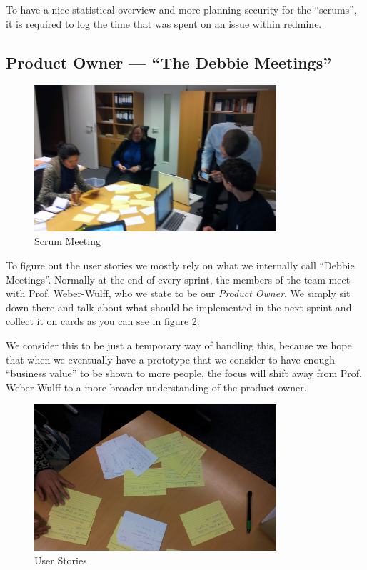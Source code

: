 To have a nice statistical overview and more planning security for the \enquote{scrums}, it is required to log the time 
that was spent on an issue within redmine.


\subsection{Product Owner --- \enquote{The Debbie Meetings}}


\begin{figure}[!h]
  \centering
    \includegraphics[width=0.8\textwidth]{images/2011-11-15-user-stories-6.jpg}
  \caption{Scrum Meeting}
  \label{fig:scrumming}
\end{figure}

To figure out the user stories we mostly rely on what we internally call \enquote{Debbie Meetings}.
Normally at the end of every sprint, the members of the team meet with Prof. Weber-Wulff, who we state to be our \textit{Product
Owner}. We simply sit down there and talk about what should be implemented in the next sprint and collect it on cards as
you can see in figure \ref{fig:userStories}.

We consider this to be just a temporary way of handling this, because we hope that when we eventually have a prototype 
that we consider to have enough \enquote{business value} to be shown to more people, the focus will shift away from 
Prof. Weber-Wulff to a more broader understanding of the product owner. 

\begin{figure}[!h]
  \centering
    \includegraphics[width=0.8\textwidth]{images/2011-11-15-user-stories-4.jpg}
  \caption{User Stories}
  \label{fig:userStories}
\end{figure}

